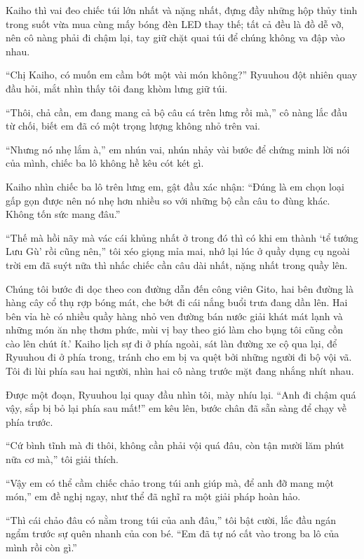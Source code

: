﻿\documentclass[../main.tex]{subfiles}
\begin{document}
Kaiho thì vai đeo chiếc túi lớn nhất và nặng nhất, đựng đầy những hộp thủy tinh trong suốt vừa mua cùng mấy bóng đèn LED thay thế; tất cả đều là đồ dễ vỡ, nên cô nàng phải đi chậm lại, tay giữ chặt quai túi để chúng không va đập vào nhau.

``Chị Kaiho, có muốn em cầm bớt một vài món không?'' Ryuuhou đột nhiên quay đầu hỏi, mắt nhìn thấy tôi đang khòm lưng giữ túi.

``Thôi, chả cần, em đang mang cả bộ câu cá trên lưng rồi mà,'' cô nàng lắc đầu từ chối, biết em đã có một trọng lượng không nhỏ trên vai.

``Nhưng nó nhẹ lắm à,'' em nhún vai, nhún nhảy vài bước để chứng minh lời nói của mình, chiếc ba lô không hề kêu cót két gì.

Kaiho nhìn chiếc ba lô trên lưng em, gật đầu xác nhận: ``Đúng là em chọn loại gấp gọn được nên nó nhẹ hơn nhiều so với những bộ cần câu to đùng khác. Không tốn sức mang đâu.''

``Thế mà hồi nãy mà vác cái khủng nhất ở trong đó thì có khi em thành `tể tướng Lưu Gù' rồi cũng nên,'' tôi xéo giọng mỉa mai, nhớ lại lúc ở quầy dụng cụ ngoài trời em đã suýt nữa thì nhấc chiếc cần câu dài nhất, nặng nhất trong quầy lên.

Chúng tôi bước đi dọc theo con đường dẫn đến công viên Gito, hai bên đường là hàng cây cổ thụ rợp bóng mát, che bớt đi cái nắng buổi trưa đang dần lên. Hai bên vỉa hè có nhiều quầy hàng nhỏ ven đường bán nước giải khát mát lạnh và những món ăn nhẹ thơm phức, mùi vị bay theo gió làm cho bụng tôi cũng cồn cào lên chút ít.' Kaiho lịch sự đi ở phía ngoài, sát làn đường xe cộ qua lại, để Ryuuhou đi ở phía trong, tránh cho em bị va quệt bởi những người đi bộ vội vã. Tôi đi lùi phía sau hai người, nhìn hai cô nàng trước mặt đang nhắng nhít nhau.

Được một đoạn, Ryuuhou lại quay đầu nhìn tôi, mày nhíu lại. ``Anh đi chậm quá vậy, sắp bị bỏ lại phía sau mất!'' em kêu lên, bước chân đã sẵn sàng để chạy về phía trước.

``Cứ bình tĩnh mà đi thôi, không cần phải vội quá đâu, còn tận mười lăm phút nữa cơ mà,'' tôi giải thích.

``Vậy em có thể cầm chiếc chảo trong túi anh giúp mà, để anh đỡ mang một món,'' em đề nghị ngay, như thể đã nghĩ ra một giải pháp hoàn hảo.

``Thì cái chảo đâu có nằm trong túi của anh đâu,'' tôi bật cười, lắc đầu ngán ngẩm trước sự quên nhanh của con bé. ``Em đã tự nó cất vào trong ba lô của mình rồi còn gì.''
\end{document}
